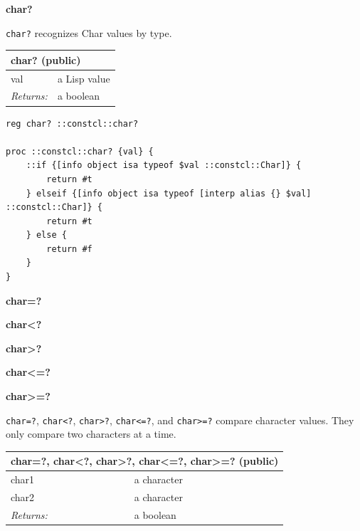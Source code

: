 \documentclass[twoside,9pt]{report}
\begin{document}
\textbf{char?}


\texttt{char?} recognizes Char values by type.

\begin{tabular}{ |l l| }
\hline
\multicolumn{2}{|l|}{char? (public)} \\
\hline
val & a Lisp value \\
\textit{Returns:} & a boolean \\
\hline
\end{tabular}

\noindent\makebox[\linewidth]{\rule{\linewidth}{0.4pt}}
\begin{lstlisting}
reg char? ::constcl::char?
 
proc ::constcl::char? {val} {
    ::if {[info object isa typeof $val ::constcl::Char]} {
        return #t
    } elseif {[info object isa typeof [interp alias {} $val] ::constcl::Char]} {
        return #t
    } else {
        return #f
    }
}
\end{lstlisting}
\noindent\makebox[\linewidth]{\rule{\linewidth}{0.4pt}}

\textbf{char=?}


\textbf{char<?}


\textbf{char>?}


\textbf{char<=?}


\textbf{char>=?}


\texttt{char=?}, \texttt{char<?}, \texttt{char>?}, \texttt{char<=?}, and \texttt{char>=?} compare character values. They only compare two characters at a time.

\begin{tabular}{ |l l| }
\hline
\multicolumn{2}{|l|}{char=?, char<?, char>?, char<=?, char>=? (public)} \\
\hline
char1 & a character \\
char2 & a character \\
\textit{Returns:} & a boolean \\
\hline
\end{tabular}
\end{document}
